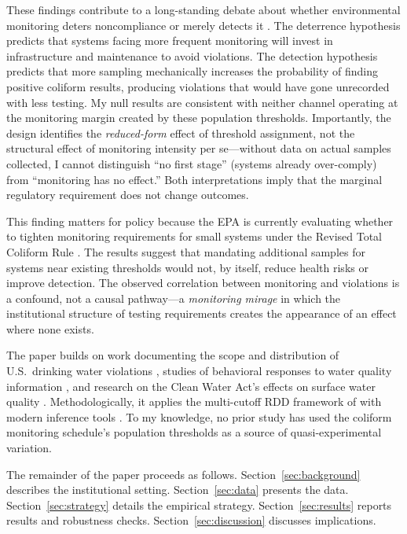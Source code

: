 \documentclass[12pt]{article}
\begin{document}
These findings contribute to a long-standing debate about whether environmental monitoring deters noncompliance or merely detects it \citep{gray2011effectiveness, shimshack2007enforce}. The deterrence hypothesis predicts that systems facing more frequent monitoring will invest in infrastructure and maintenance to avoid violations. The detection hypothesis predicts that more sampling mechanically increases the probability of finding positive coliform results, producing violations that would have gone unrecorded with less testing. My null results are consistent with neither channel operating at the monitoring margin created by these population thresholds. Importantly, the design identifies the \textit{reduced-form} effect of threshold assignment, not the structural effect of monitoring intensity per se---without data on actual samples collected, I cannot distinguish ``no first stage'' (systems already over-comply) from ``monitoring has no effect.'' Both interpretations imply that the marginal regulatory requirement does not change outcomes.

This finding matters for policy because the EPA is currently evaluating whether to tighten monitoring requirements for small systems under the Revised Total Coliform Rule \citep{marcus2023testing}. The results suggest that mandating additional samples for systems near existing thresholds would not, by itself, reduce health risks or improve detection. The observed correlation between monitoring and violations is a confound, not a causal pathway---a \textit{monitoring mirage} in which the institutional structure of testing requirements creates the appearance of an effect where none exists.

The paper builds on work documenting the scope and distribution of U.S.\ drinking water violations \citep{allaire2018national, switzer2018class, timmins2023environmental}, studies of behavioral responses to water quality information \citep{graff2011water, bennear2009right}, and research on the Clean Water Act's effects on surface water quality \citep{keiser2019consequences}. Methodologically, it applies the multi-cutoff RDD framework of \citet{cattaneo2016interpreting} with modern inference tools \citep{calonico2014robust, cattaneo2020simple}. To my knowledge, no prior study has used the coliform monitoring schedule's population thresholds as a source of quasi-experimental variation.

The remainder of the paper proceeds as follows. Section~\ref{sec:background} describes the institutional setting. Section~\ref{sec:data} presents the data. Section~\ref{sec:strategy} details the empirical strategy. Section~\ref{sec:results} reports results and robustness checks. Section~\ref{sec:discussion} discusses implications.
\end{document}
